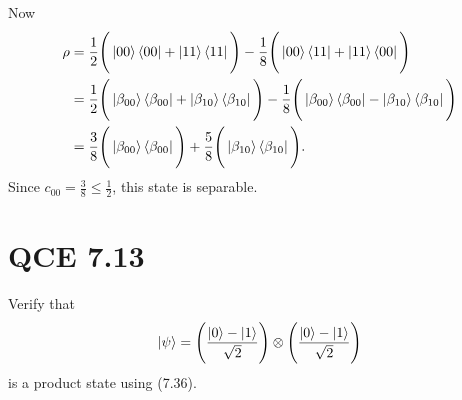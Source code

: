 \documentclass[10pt]{article}
\begin{document}
Now
\begin{align*}
\rho &= \frac{1}{2} \Bigg( \ket{00}\bra{00} + \ket{11} \bra{11} \Bigg) - \frac{1}{8} \Bigg( \ket{00} \bra{11} + \ket{11} \bra{00} \Bigg) \\
        &= \frac{1}{2} \Bigg( \ket{\beta_{00}} \bra{\beta_{00}} + \ket{\beta_{10}} \bra{\beta_{10}} \Bigg) - \frac{1}{8} \Bigg( \ket{\beta_{00}} \bra{\beta_{00}} - \ket{\beta_{10}} \bra{\beta_{10}} \Bigg) \\
        &= \frac{3}{8} \Bigg( \ket{\beta_{00}} \bra{\beta_{00}} \Bigg) + \frac{5}{8} \Bigg( \ket{\beta_{10}} \bra{\beta_{10}} \Bigg).
\end{align*}
Since $c_{00} = \frac{3}{8} \leq \frac{1}{2}$, this state is separable.

\section*{QCE 7.13}
Verify that 
\[
\ket{\psi} = \Bigg( \frac{\ket{0} - \ket{1}}{\sqrt{2}}\Bigg) \otimes \Bigg( \frac{\ket{0} - \ket{1}}{\sqrt{2}}\Bigg) 
\]
is a product state using (7.36).
\end{document}
